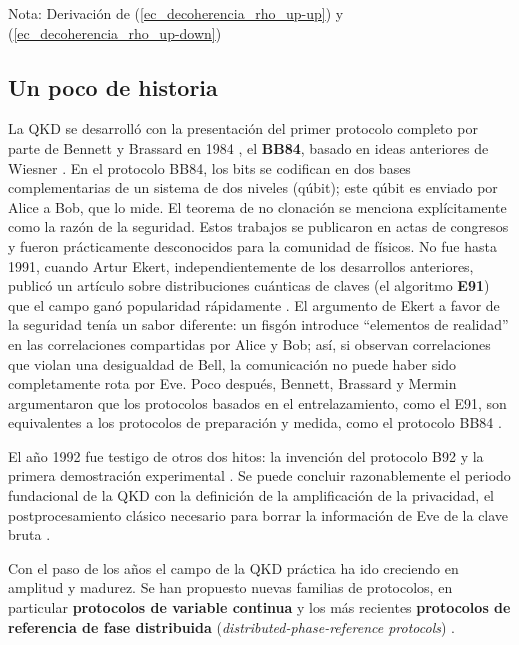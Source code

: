 \documentclass[a4paper,11pt]{book} %
\numberwithin{equation}{chapter}
\begin{document}
\begin{mybox_blue}{Nota: Derivación de (\ref{ec_decoherencia_rho_up-up}) y  (\ref{ec_decoherencia_rho_up-down})}
		
		\subsection{Un poco de historia}

La QKD se desarrolló con la presentación del primer protocolo completo por parte de Bennett y Brassard en 1984 \cite{BB84}, el \textbf{BB84}, basado en ideas anteriores de Wiesner \cite{BB84_Wiesner_1983}. En el protocolo BB84, los bits se codifican en dos bases complementarias de un sistema de dos niveles (qúbit); este qúbit es enviado por Alice a Bob, que lo mide. El teorema de no clonación se menciona explícitamente como la razón de la seguridad. Estos trabajos se publicaron en actas de congresos y fueron prácticamente desconocidos para la comunidad de físicos. No fue hasta 1991, cuando Artur Ekert, independientemente de los desarrollos anteriores, publicó un artículo sobre distribuciones cuánticas de claves (el algoritmo \textbf{E91}) que el campo ganó popularidad rápidamente \cite{Ekert-1991}. El argumento de Ekert a favor de la seguridad tenía un sabor diferente: un fisgón introduce ``elementos de realidad'' en las correlaciones compartidas por Alice y Bob; así, si observan correlaciones que violan una desigualdad de Bell, la comunicación no puede haber sido completamente rota por Eve. Poco después, Bennett, Brassard y Mermin argumentaron que los protocolos basados en el entrelazamiento, como el E91, son equivalentes a los protocolos de preparación y medida, como el protocolo BB84  \cite{BB84_E91_iguales}. 

El año 1992 fue testigo de otros dos hitos: la invención del protocolo B92 \cite{B92} y la primera demostración experimental \cite{experiment_QKD}. Se puede concluir razonablemente el periodo fundacional de la QKD con la definición de la amplificación de la privacidad, el postprocesamiento clásico necesario para borrar la información de Eve de la clave bruta \cite{Privacy_amplification}.

Con el paso de los años el campo de la QKD práctica ha ido creciendo en amplitud y madurez. Se han propuesto nuevas familias de protocolos, en particular \textbf{protocolos de variable continua} \cite{Continue_var_Ralph_1999, Continue_var_Hillery_2000, Continue_var_Cerf_2001, Continue_var_Gottesman_2001, Continue_var_Grosshans_2002, Continue_var_Silberhorn_2002} y los más recientes \textbf{protocolos de referencia de fase distribuida} (\textit{distributed-phase-reference protocols}) \cite{Phase_Inoue_2002, Phase_Stucki_2005}. 


\end{mybox_blue}
\end{document}
